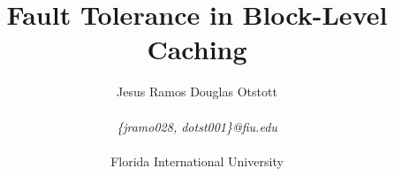 \documentclass[letterpaper,twocolumn,10pt]{article}
\title{\Large \bf Fault Tolerance in Block-Level Caching}
\author{
  {\rm Jesus Ramos}
  \qquad
  {\rm Douglas Otstott}
  \\ \\
  \textit{\{jramo028, dotst001\}@fiu.edu}
  \\ \\
  Florida International University
}
\date{}
\begin{document}
\maketitle

\begin{abstract}
  
\end{abstract}










\end{document}
